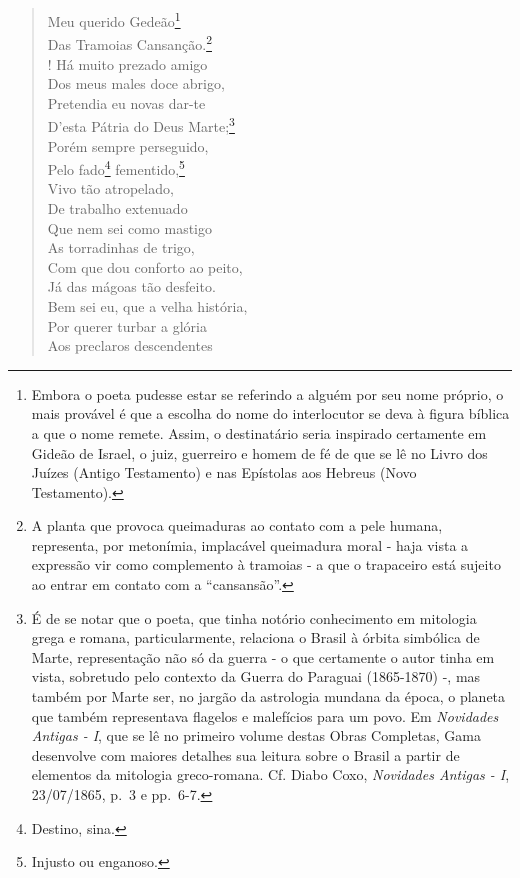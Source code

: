 \begin{verse}
Meu querido Gedeão\footnote{ Embora o poeta pudesse estar se
  referindo a alguém por seu nome próprio, o mais provável é que a
  escolha do nome do interlocutor se deva à figura bíblica a que o nome
  remete. Assim, o destinatário seria inspirado certamente em Gideão de
  Israel, o juiz, guerreiro e homem de fé de que se lê no Livro dos
  Juízes (Antigo Testamento) e nas Epístolas aos Hebreus (Novo
  Testamento).}\\
Das Tramoias Cansanção.\footnote{ A planta que provoca queimaduras ao
  contato com a pele humana, representa, por metonímia, implacável
  queimadura moral - haja vista a expressão vir como complemento à
  tramoias - a que o trapaceiro está sujeito ao entrar em contato com a
  ``cansansão''.}\\!
Há muito prezado amigo\\
Dos meus males doce abrigo,\\
Pretendia eu novas dar-te\\
D'esta Pátria do Deus Marte;\footnote{ É de se notar que o poeta, que
  tinha notório conhecimento em mitologia grega e romana,
  particularmente, relaciona o Brasil à órbita simbólica de Marte,
  representação não só da guerra - o que certamente o autor tinha em
  vista, sobretudo pelo contexto da Guerra do Paraguai (1865-1870) -,
  mas também por Marte ser, no jargão da astrologia mundana da época, o
  planeta que também representava flagelos e malefícios para um povo. Em
  \emph{Novidades Antigas - I}, que se lê no primeiro volume destas
  Obras Completas, Gama desenvolve com maiores detalhes sua leitura
  sobre o Brasil a partir de elementos da mitologia greco-romana. Cf.
  Diabo Coxo, \emph{Novidades Antigas - I}, 23/07/1865, p.~3 e pp.~6-7.}\\
Porém sempre perseguido,\\
Pelo fado\footnote{ Destino, sina.} fementido,\footnote{ Injusto
  ou enganoso.}\\
Vivo tão atropelado,\\
De trabalho extenuado\\
Que nem sei como mastigo\\
As torradinhas de trigo,\\
Com que dou conforto ao peito,\\
Já das mágoas tão desfeito.\\
Bem sei eu, que a velha história,\\
Por querer turbar a glória\\
Aos preclaros descendentes\\

\end{verse}
